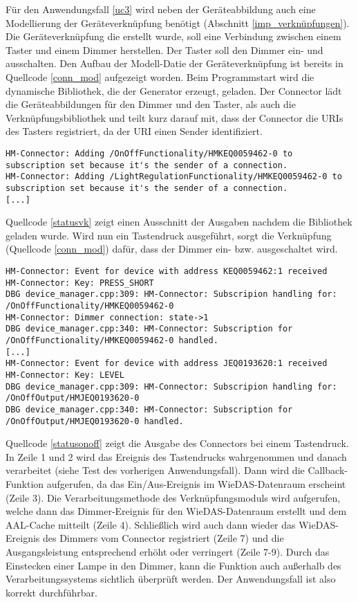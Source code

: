 Für den Anwendungsfall \ref{uc3} wird neben der Geräteabbildung auch eine Modellierung der Geräteverknüpfung benötigt
(Abschnitt \ref{imp_verknüpfungen}).
Die Geräteverknüpfung die erstellt wurde, soll eine Verbindung zwischen einem Taster und einem Dimmer herstellen.
Der Taster soll den Dimmer ein- und ausschalten.
Den Aufbau der Modell-Datie der Geräteverknüpfung ist bereits in Quellcode \ref{conn_mod} aufgezeigt worden.
Beim Programmstart wird die dynamische Bibliothek, die der Generator erzeugt, geladen.
Der Connector lädt die Geräteabbildungen für den Dimmer und den Taster, als auch die Verknüpfungsbibliothek
und teilt kurz darauf mit, dass der Connector die URIs des Tasters registriert, da der URI einen
Sender identifiziert.
\begin{lstlisting}[frame=single,caption={Ausgaben des Connectors nach dem Laden von Verknüpfungsbibliotheken},label=statusvk]
HM-Connector: Adding /OnOffFunctionality/HMKEQ0059462-0 to subscription set because it's the sender of a connection.
HM-Connector: Adding /LightRegulationFunctionality/HMKEQ0059462-0 to subscription set because it's the sender of a connection.
[...]
\end{lstlisting}

Quellcode \ref{statusvk} zeigt einen Ausschnitt der Ausgaben nachdem die Bibliothek geladen wurde.
Wird nun ein Tastendruck ausgeführt, sorgt die Verknüpfung (Quellcode \ref{conn_mod}) dafür, dass der Dimmer
ein- bzw. ausgeschaltet wird.
\begin{lstlisting}[frame=single,caption={Ausgabe des Connectors bei Verarbeitung durch das Verknüpfungsmodul},label=statusonoff]
HM-Connector: Event for device with address KEQ0059462:1 received
HM-Connector: Key: PRESS_SHORT
DBG device_manager.cpp:309: HM-Connector: Subscripion handling for: /OnOffFunctionality/HMKEQ0059462-0
HM-Connector: Dimmer connection: state->1
DBG device_manager.cpp:340: HM-Connector: Subscription for /OnOffFunctionality/HMKEQ0059462-0 handled.
[...]
HM-Connector: Event for device with address JEQ0193620:1 received
HM-Connector: Key: LEVEL
DBG device_manager.cpp:309: HM-Connector: Subscripion handling for: /OnOffOutput/HMJEQ0193620-0
DBG device_manager.cpp:340: HM-Connector: Subscription for /OnOffOutput/HMJEQ0193620-0 handled.
\end{lstlisting}

Quellcode \ref{statusonoff} zeigt die Ausgabe des Connectors bei einem Tastendruck.
In Zeile 1 und 2 wird das Ereignis des Tastendrucks wahrgenommen und danach verarbeitet (siehe Test des vorherigen Anwendungsfall).
Dann wird die Callback-Funktion aufgerufen, da das Ein/Aus-Ereignis im WieDAS-Datenraum erscheint (Zeile 3).
Die Verarbeitungsmethode des Verknüpfungsmoduls wird aufgerufen, welche dann das Dimmer-Ereignis für den WieDAS-Datenraum
erstellt und dem AAL-Cache mitteilt (Zeile 4).
Schließlich wird auch dann wieder das WieDAS-Ereignis des Dimmers vom Connector registriert (Zeile 7) und die Ausgangsleistung
entsprechend erhöht oder verringert (Zeile 7-9).
Durch das Einstecken einer Lampe in den Dimmer, kann die Funktion auch außerhalb des Verarbeitungssystems sichtlich überprüft werden.
Der Anwendungsfall ist also korrekt durchführbar.

